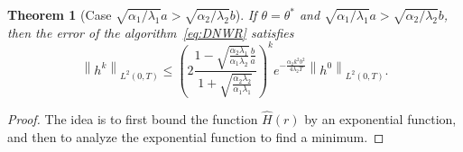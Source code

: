 \documentclass[10pt,a4paper]{amsart}
\newtheorem{theorem}{Theorem}
\newcommand{\norm}[1]{\left\lVert#1\right\rVert}
\begin{document}
\begin{theorem}[Case $\sqrt{\alpha_1/\lambda_1} a > \sqrt{\alpha_2/\lambda_2} b$]\label{thm:cont-case1}
If $\theta = \theta^*$ and $\sqrt{\alpha_1/\lambda_1} a > \sqrt{\alpha_2/\lambda_2} b$, then the error of the algorithm~\eqref{eq:DNWR} satisfies 
\begin{equation}\label{eq:ContEst1}
\norm{h^k}_{L^2(0, T)} \leq \left(2\frac{1 - \sqrt{\frac{\alpha_2 \lambda_1}{\alpha_1\lambda_2}}\frac{b}{a}}{1 + \sqrt{\frac{\alpha_2 \lambda_2}{\alpha_1\lambda_1}}} \right)^k e^{-\frac{\alpha_2 k^2b^2}{4\lambda_2 T}} \norm{h^0}_{L^2(0, T)}.
\end{equation}
\end{theorem}


\begin{proof}
The idea is to first bound the function $\hat H(r)$ by an exponential function, and then to analyze the exponential function to find a minimum.


\end{proof}
\end{document}
